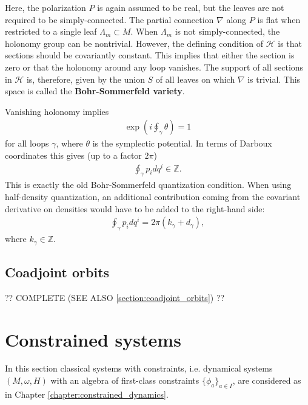     \begin{method}
        Here, the polarization $P$ is again assumed to be real, but the leaves are not required to be simply-connected. The partial connection $\nabla$ along $P$ is flat when restricted to a single leaf $\Lambda_m\subset M$. When $\Lambda_m$ is not simply-connected, the holonomy group can be nontrivial. However, the defining condition of $\mathcal{H}$ is that sections should be covariantly constant. This implies that either the section is zero or that the holonomy around any loop vanishes. The support of all sections in $\mathcal{H}$ is, therefore, given by the union $S$ of all leaves on which $\nabla$ is trivial. This space is called the \textbf{Bohr-Sommerfeld variety}.

        Vanishing holonomy implies
        \begin{gather}
            \exp\left(i\oint_\gamma\theta\right) = 1
        \end{gather}
        for all loops $\gamma$, where $\theta$ is the symplectic potential. In terms of Darboux coordinates this gives (up to a factor $2\pi$)
        \begin{gather}
            \oint_\gamma p_idq^i\in\mathbb{Z}.
        \end{gather}
        This is exactly the old Bohr-Sommerfeld quantization condition. When using half-density quantization, an additional contribution coming from the covariant derivative on densities would have to be added to the right-hand side:
        \begin{gather}
            \oint_\gamma p_idq^i = 2\pi(k_\gamma + d_\gamma),
        \end{gather}
        where $k_\gamma\in\mathbb{Z}$.
    \end{method}

\subsection{Coadjoint orbits}

    ?? COMPLETE (SEE ALSO \ref{section:coadjoint_orbits}) ??

\section{Constrained systems}

    In this section classical systems with constraints, i.e. dynamical systems $(M,\omega,H)$ with an algebra of first-class constraints $\{\phi_a\}_{a\in I}$, are considered as in Chapter \ref{chapter:constrained_dynamics}.

